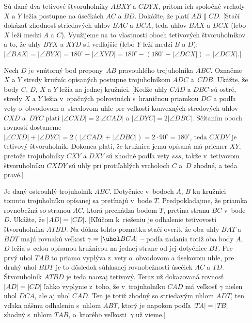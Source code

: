 {\D
Sú dané dva tetivové štvoruholníky $ABXY$ a $CDYX$, pritom
ich spoločné vrcholy $X$ a $Y$ ležia postupne na úsečkách
$AC$ a $BD$. Dokážte, že platí $AB\parallel CD$.
[Stačí dokázať zhodnosť striedavých uhlov $BAC$ a $DCA$, teda uhlov
$BAX$ a $DCX$ (lebo $X$ leží medzi $A$ a $C$).
Využijeme na to vlastnosti oboch tetivových
štvoruholníkov a to, že uhly $BYX$ a $XYD$ sú vedľajšie
(lebo $Y$ leží medzi $B$ a $D$):
$|\angle BAX|=|\angle BYX|=180^{\circ}-|\angle
XYD|=180^{\circ}-(180^{\circ}-|\angle DCX|)=|\angle DCX|.$]

Nech $D$ je vnútorný bod prepony~$AB$ pravouhlého trojuholníka $ABC$.
Označme $X$ a $Y$ stredy kružníc opísaných postupne
trojuholníkom $ADC$ a~$CDB$. Ukážte, že body $C$, $D$, $X$ a $Y$
ležia na jednej kružnici.
[Keďže uhly $CAD$ a $DBC$ sú ostré,
stredy $X$ a $Y$ ležia v~opačných polrovinách s~hraničnou priamkou
$DC$ a podľa vety o~obvodovom a~stredovom uhle pre veľkosti
konvexných stredových uhlov $CXD$ a~$DYC$
platí $|\angle CXD|=2|\angle CAD|$ a $|\angle DYC|=2|\angle DBC|$.
Sčítaním oboch rovností dostaneme
$|\angle CXD|+|\angle DYC|=2(|\angle CAD|+|\angle
DBC|)=2\cdot90^\circ=180^\circ$, teda $CXDY$ je tetivový
štvoruholník. Dokonca platí, že kružnica jemu opísaná má
priemer $XY$, pretože trojuholníky $CXY$ a $DXY$ sú zhodné podľa vety
$sss$, takže v~tetivovom štvoruholníku $CXDY$ sú uhly
pri protiľahlých vrcholoch $C$ a~$D$ zhodné, a teda pravé.]

Je daný ostrouhlý trojuholník $ABC$. Dotyčnice v~bodoch $A$, $B$ ku
kružnici tomuto trojuholníku opísanej sa pretínajú v~bode $T$.
Predpokladajme, že priamka rovnobežná so stranou $AC$, ktorá
prechádza bodom $T$, pretína stranu $BC$ v~bode $D$.
Ukážte, že $|AD| = |CD|$.
[Kľúčom k~riešeniu je odhalenie
tetivovosti štvoruholníka $ATBD$. Na dôkaz tohto poznatku
stačí overiť, že oba uhly $BAT$ a $BDT$ majú rovnakú veľkosť
$\gamma=|\uhol BCA|$ -- podľa zadania totiž oba body $A$, $D$ ležia
s~celou opísanou kružnicou na jednej strane od jej dotyčnice $BT$.
Pre prvý uhol $TAB$ to priamo vyplýva z~vety o~obvodovom a
úsekovom uhle, pre druhý uhol $BDT$ je to dôsledok súhlasnej
rovnobežnosti úsečiek $AC$ a $TD$. Štvoruholník $ATBD$
je teda naozaj tetivový.
Teraz už dokazovaná rovnosť $|AD|=|CD|$ ľahko vyplynie z~toho,
že v~trojuholníku $CAD$ má veľkosť $\gamma$ nielen uhol $DCA$, ale
aj uhol $CAD$. Ten je totiž zhodný so striedavým uhlom $ADT$,
ten vďaka nášmu odhaleniu s~uhlom $ABT$, ktorý je napokon podľa
$|TA|=|TB|$ zhodný s~uhlom $TAB$, o~ktorého veľkosti~$\gamma$ už vieme.]

}
